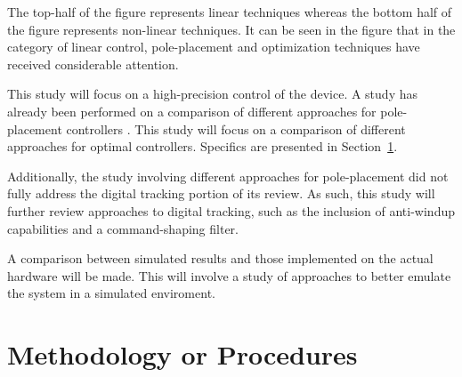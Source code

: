 \documentclass[crop=false,float=true,class=scrartcl]{standalone}
\begin{document}
The top-half of the figure represents linear techniques 
whereas the bottom half of the figure represents non-linear techniques.  
It can be seen in the figure that in the category of linear control, 
pole-placement and optimization techniques have received considerable attention.

This study will focus on a high-precision control of the device.
A study has already been performed on a comparison of different approaches for pole-placement controllers \cite{REF:Thesis:Masters:2012-Peltier}.
This study will focus on a comparison of different approaches for optimal controllers.
Specifics are presented in Section~\ref{SEC:methodology}.

Additionally, the study involving different approaches for pole-placement \cite{REF:Thesis:Masters:2012-Peltier}
did not fully address the digital tracking portion of its review.
As such, this study will further review approaches to digital tracking, 
such as the inclusion of anti-windup capabilities and a command-shaping filter.

A comparison between simulated results and those implemented on the actual hardware will be made.
This will involve a study of approaches to better emulate the system in a simulated enviroment.




\clearpage




\section{Methodology or Procedures}
\label{SEC:methodology}
\end{document}
